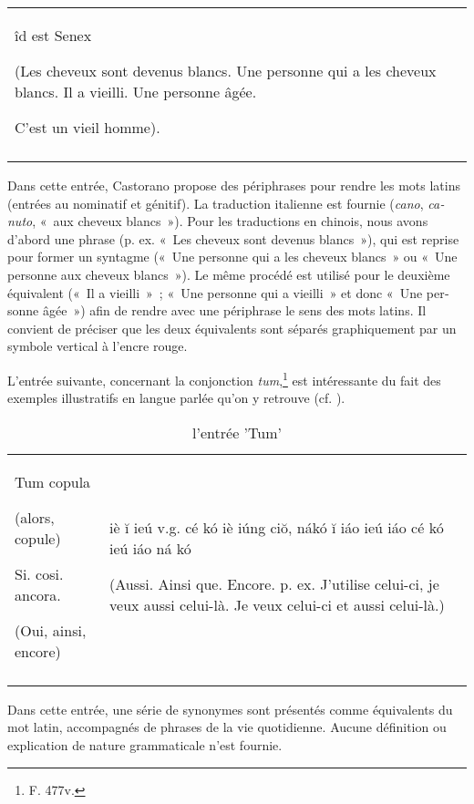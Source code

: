 \documentclass[output=paper,colorlinks,citecolor=brown,arabicfont,chinesefont,booklanguage=french]{langscibook}
\begin{document}
\begin{otherlanguage}{french}
\begin{table}
\begin{tabularx}{\linewidth}{ QQ }
\^ id est Senex

\footnotesize (Les cheveux sont devenus blancs. Une personne qui a les cheveux blancs. Il a vieilli. Une personne âgée.

C’est un vieil homme). \\
\lspbottomrule
\end{tabularx}
\end{table}

Dans cette entrée, Castorano propose des périphrases pour rendre les mots latins (entrées au nominatif et génitif). La traduction italienne est fournie (\emph{cano}, \emph{canuto}, «~aux cheveux blancs~»). Pour les traductions en chinois, nous avons d’abord une phrase (p. ex. «~Les cheveux sont devenus blancs~»), qui est reprise pour former un syntagme («~Une personne qui a les cheveux blancs~» ou «~Une personne aux cheveux blancs~»). Le même procédé est utilisé pour le deuxième équivalent («~Il a vieilli~»~; «~Une personne qui a vieilli~» et donc «~Une personne âgée~») afin de rendre avec une périphrase le sens des mots latins. Il convient de préciser que les deux équivalents sont séparés graphiquement par un symbole vertical à l’encre rouge. 

\largerpage
L’entrée suivante, concernant la conjonction \emph{tum},\footnote{F. 477v.} est intéressante du fait des exemples illustratifs en langue parlée qu’on y retrouve (cf. ).

\begin{table}
\caption{l'entrée 'Tum'}
\label{tab:gianninoto:3}
\label{tab:gianninoto:frequencies3}
\begin{tabularx}{\linewidth}{ QQ }
\lsptoprule
Tum copula

\footnotesize (alors, copule)

\normalsize Si. cosi. ancora.

\footnotesize (Oui, ainsi, encore) & {}
 
iè   ĭ  ieú  v.g. cé kó iè iúng ciŏ, nákó ĭ iáo ieú iáo cé kó ieú iáo ná kó

\footnotesize (Aussi. Ainsi que. Encore. p. ex. J’utilise celui-ci, je veux aussi celui-là. Je veux celui-ci et aussi celui-là.) \\
\lspbottomrule
\end{tabularx}
\end{table}

Dans cette entrée, une série de synonymes sont présentés comme équivalents du mot latin, accompagnés de phrases de la vie quotidienne. Aucune définition ou explication de nature grammaticale n’est fournie. 


\end{otherlanguage}
\end{document}
